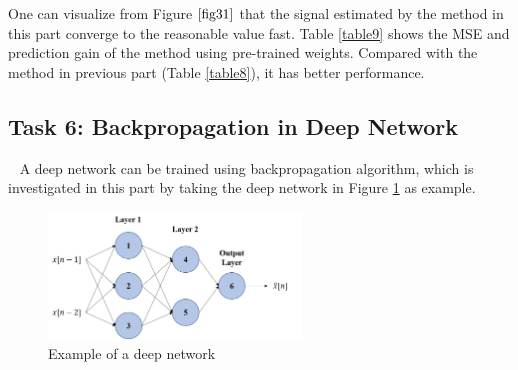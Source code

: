\documentclass[10pt]{article}
\begin{document}
One can visualize from Figure $\ref{fig31}$ that the signal estimated by the method in 
this part converge to the reasonable value fast. Table \ref{table9} shows the MSE and 
prediction gain of the method using pre-trained weights. Compared with the method 
in previous part (Table \ref{table8}), it has better performance.

\begin{table}[htbp]
	\caption{Pre-trained weights for time-series with non-zero mean}
	\centering
\end{table}

\subsection{Task 6: Backpropagation in Deep Network}
\ \indent
A deep network can be trained using backpropagation algorithm, which is investigated in this part 
by taking the deep network in Figure \ref{fig32} as example.

\begin{figure}[htbp]
    \centering
	\includegraphics[width=0.6\textwidth]{fig/4.6_1.png}

    \caption{Example of a deep network}
    \label{fig32}
\end{figure}
\end{document}

